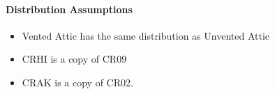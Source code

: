 

\paragraph{Distribution Assumptions}
% 
\begin{itemize}

\item
  Vented Attic has the same distribution as Unvented Attic
\item
  CRHI is a copy of CR09
\item
  CRAK is a copy of CR02.
\end{itemize}
